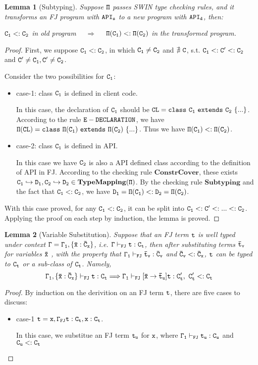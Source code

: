 \documentclass[letterpaper]{article}
\newtheorem{lemma}{Lemma}
\begin{document}
\begin{lemma}[Subtyping]
Suppose $\tt \Pi$ passes SWIN type checking rules, and it transforms an FJ program with $\tt API_s$ to a new program with $\tt API_d$, then:\par
$\tt C_1<: C_2 $ in old program ~~$\Longrightarrow$~~ $\tt\Pi(C_1)<:\Pi(C_2)$ in the transformed program.
\end{lemma}
\begin{proof}
First, we suppose $\tt C_1 <: C_2$, in which $\tt C_1 \neq C_2$ and $\tt\nexists~C$, s.t. $\tt C_1<:C'<:C_2$ and $\tt C'\neq C_1, C'\neq C_2$. 
 
Consider the two possibilities for $\tt C_1$:
\begin{itemize}
\item case-1: class $\tt C_1$ is defined in client code.

In this case, the declaration of $\tt C_1$ should be $\tt CL = class~C_1~extends~C_2~\{...\}$. According to the rule $\tt E-DECLARATION$, we have $\tt \Pi(CL)=class~\Pi(C_1)~extends~\Pi(C_2)~\{...\}$. Thus we have $\tt\Pi(C_1)<:\Pi(C_2)$.

\item case-2: class $\tt C_1$ is defined in API. 

In this case we have $\tt C_2$ is also a API defined class according to the definition of API in FJ. According to the checking rule $\mathbf{ConstrCover}$, these exists $\tt C_1\hookrightarrow D_1, C_2\hookrightarrow D_2 \in \mathbf{TypeMapping}(\Pi)$. By the checking rule $\mathbf{Subtyping}$ and the fact that $\tt C_1<:C_2$, we have $\tt D_1 = \Pi(C_1)<:D_2=\Pi(C_2)$.
\end{itemize}
With this case proved, for any $\tt C_1 <: C_2$, it can be split into $\tt C_1<: C' <: ... <: C_2$. Applying the proof on each step by induction, the lemma is proved.
\end{proof}

\begin{lemma}[Variable Substitution]
Suppose that an FJ term $\tt t$ is well typed under context $\tt \Gamma=\Gamma_1,\{\bar{x}:\bar{C}_x\}$, i.e. $\tt \Gamma\vdash_{FJ} t:C_t$, then after substituting terms $\tt \bar{t}_v$ for variables $\tt \bar{x}$ , with the property that $\tt\Gamma_1\vdash_{FJ}\bar{t}_v:\bar{C}_v$ and $\tt\bar{C}_v <: \bar{C}_x$, $\tt t$ can be typed to $\tt C_t$ or a sub-class of $\tt C_t$. Namely,
$$\tt \Gamma_1,\{\bar{x}:\bar{C}_x\} \vdash_{FJ} t:C_t \Longrightarrow \Gamma_1\vdash_{FJ} [\bar{x}\rightarrow\bar{t}_u]t: C'_t,\ C'_t <: C_t$$
\end{lemma}
\begin{proof}
By induction on the derivition on an FJ term $\tt t$, there are five cases to discuss:
\begin{itemize}
\item case-1 $\tt t = x, \Gamma_{FJ} t:C_t, x:C_t$.

In this case, we substitue an FJ term $\tt t_u$ for $\tt x$, where $\tt \Gamma_1\vdash_{FJ} t_u:C_u$ and $\tt C_u <: C_t$
\end{itemize}

\end{proof}
\end{document}
